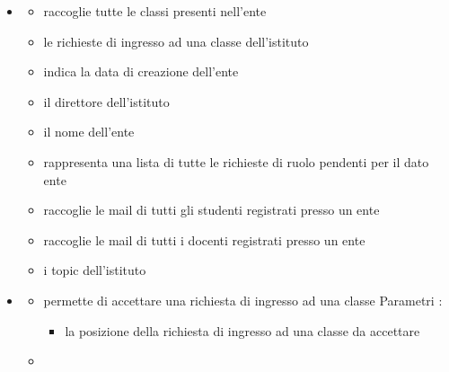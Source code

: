\begin{itemize}
\item {}
\begin{itemize}
\item {}
\newline
raccoglie tutte le classi presenti nell'ente
\item {}
\newline
le richieste di ingresso ad una classe dell'istituto
\item {}
\newline
indica la data di creazione dell'ente
\item {}
\newline
il direttore dell'istituto
\item {}
\newline
il nome dell'ente
\item {}
\newline
rappresenta una lista di tutte le richieste di ruolo pendenti per il dato ente
\item {}
\newline
raccoglie le mail di tutti gli studenti registrati presso un ente
\item {}
\newline
raccoglie le mail di tutti i docenti registrati presso un ente
\item {}
\newline
i topic dell'istituto
\end{itemize}
\item {}
\begin{itemize}
\item {}
\newline
permette di accettare una richiesta di ingresso ad una classe
\newline
Parametri :
\begin{itemize}
\item {}
\newline
la posizione della richiesta di ingresso ad una classe da accettare
\end{itemize}
\item {}
\newline

\end{itemize}
\end{itemize}
